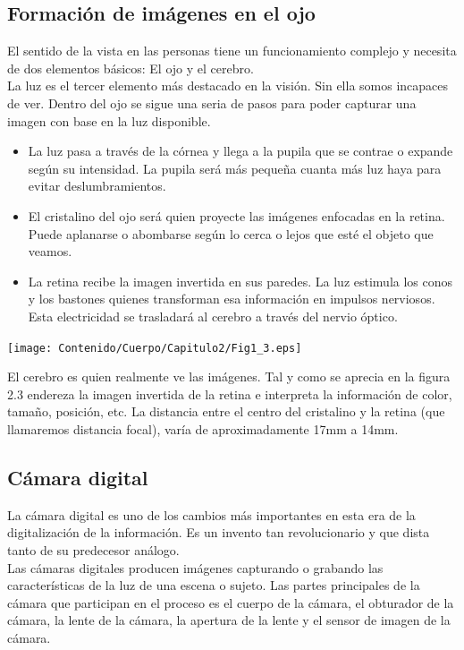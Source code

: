 \subsection{Formación de imágenes en el ojo}
El sentido de la vista en las personas tiene un funcionamiento complejo y
necesita de dos elementos básicos: El ojo y el cerebro.\\
La luz es el tercer elemento más destacado en la visión. Sin ella somos
incapaces de ver. Dentro del ojo se sigue una seria de pasos para poder capturar
una imagen con base en la luz disponible.
\begin{itemize}
	\item La luz pasa a través de la córnea y llega a la pupila que se contrae o
	      expande según su intensidad. La pupila será más pequeña cuanta más luz haya para
	      evitar deslumbramientos.
	\item El cristalino del ojo será quien proyecte las imágenes enfocadas en la retina.
	      Puede aplanarse o abombarse según lo cerca o lejos que esté el objeto que veamos.
	\item La retina recibe la imagen invertida en sus paredes. La luz estimula los
	      conos y los bastones quienes transforman esa información en impulsos nerviosos.
	      Esta electricidad se trasladará al cerebro a través del nervio óptico.
\end{itemize}
\begin{center}
	\texttt{[image: Contenido/Cuerpo/Capitulo2/Fig1\_3.eps]}
	\label{fig:MarcoTeorico:Fig3}
\end{center}
El cerebro es quien realmente ve las imágenes. Tal y como se aprecia en la figura 2.3 endereza la imagen invertida de la
retina e interpreta la información de color, tamaño, posición, etc.
La distancia entre el centro del
cristalino y la retina (que llamaremos distancia focal), varía de
aproximadamente 17mm a 14mm.\cite{Book:Jose2005}

\subsection{Cámara digital}
La cámara digital es uno de los cambios más importantes en esta era de la digitalización
de la información. Es un invento tan revolucionario y que dista tanto de su predecesor
análogo.\\
Las cámaras digitales producen imágenes capturando o grabando las características de
la luz de una escena o sujeto. Las partes principales de la cámara que participan en
el proceso es el cuerpo de la cámara, el obturador de la cámara, la lente de la cámara,
la apertura de la lente y el sensor de imagen de la cámara. \cite{WEB:CameraWorks}

